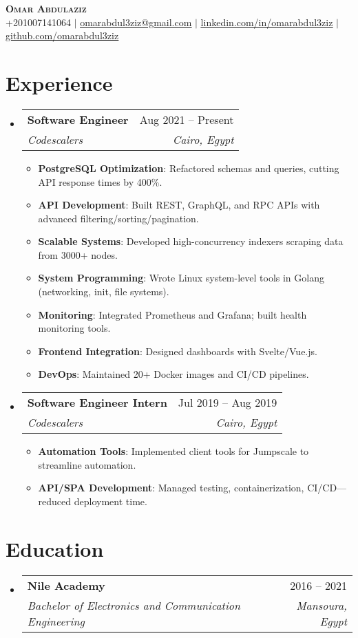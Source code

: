 \documentclass[a4paper,11pt]{article}
\makeatletter
\newcommand{\resumeSubheading}[4]{
  \item
    \begin{tabular*}{0.97\textwidth}[t]{l@{\extracolsep{\fill}}r}
      \textbf{#1} & #2 \\
      \textit{\small #3} & \textit{\small #4} \\
    \end{tabular*}\vspace{-7pt}
}
\newcommand{\resumeItem}[1]{\item \small{#1}}
\newcommand{\resumeListStart}{\begin{itemize}[leftmargin=0.15in]}
\newcommand{\resumeListEnd}{\end{itemize}\vspace{-5pt}}
\makeatother
\begin{document}
\begin{center}
    \textbf{\Huge \scshape Omar Abdulaziz} \\ \vspace{1pt}
    \small +201007141064 $|$ 
    \href{mailto:omarabdul3ziz@gmail.com}{\underline{omarabdul3ziz@gmail.com}} $|$ 
    \href{https://linkedin.com/in/omarabdul3ziz}{\underline{linkedin.com/in/omarabdul3ziz}} $|$
    \href{https://github.com/omarabdul3ziz}{\underline{github.com/omarabdul3ziz}}
\end{center}

\section{Experience}
\resumeListStart

  \resumeSubheading
    {Software Engineer}{Aug 2021 -- Present}
    {Codescalers}{Cairo, Egypt}
    \resumeListStart
      \resumeItem{\textbf{PostgreSQL Optimization}: Refactored schemas and queries, cutting API response times by 400\%.}
      \resumeItem{\textbf{API Development}: Built REST, GraphQL, and RPC APIs with advanced filtering/sorting/pagination.}
      \resumeItem{\textbf{Scalable Systems}: Developed high-concurrency indexers scraping data from 3000+ nodes.}
      \resumeItem{\textbf{System Programming}: Wrote Linux system-level tools in Golang (networking, init, file systems).}
      \resumeItem{\textbf{Monitoring}: Integrated Prometheus and Grafana; built health monitoring tools.}
      \resumeItem{\textbf{Frontend Integration}: Designed dashboards with Svelte/Vue.js.}
      \resumeItem{\textbf{DevOps}: Maintained 20+ Docker images and CI/CD pipelines.}
    \resumeListEnd

  \resumeSubheading
    {Software Engineer Intern}{Jul 2019 -- Aug 2019}
    {Codescalers}{Cairo, Egypt}
    \resumeListStart
      \resumeItem{\textbf{Automation Tools}: Implemented client tools for Jumpscale to streamline automation.}
      \resumeItem{\textbf{API/SPA Development}: Managed testing, containerization, CI/CD—reduced deployment time.}
    \resumeListEnd

\resumeListEnd

\section{Education}
\resumeListStart
  \resumeSubheading
    {Nile Academy}{2016 -- 2021}
    {Bachelor of Electronics and Communication Engineering}{Mansoura, Egypt}
\resumeListEnd
\end{document}
